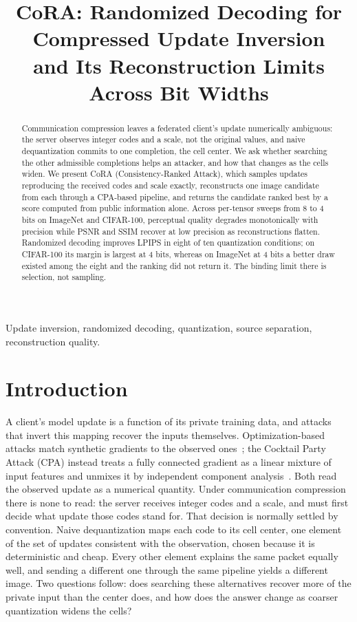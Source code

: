 \documentclass{article}
\title{CoRA: Randomized Decoding for Compressed Update Inversion\\
and Its Reconstruction Limits Across Bit Widths}
\newcommand{\cora}{CoRA}
\begin{document}
\maketitle

\begin{abstract}
Communication compression leaves a federated client's update numerically
ambiguous: the server observes integer codes and a scale, not the original
values, and naive dequantization commits to one completion, the cell center.
We ask whether searching the other admissible completions helps an attacker,
and how that changes as the cells widen. We present \cora{}
(Consistency-Ranked Attack), which samples updates reproducing the received
codes and scale exactly, reconstructs one image candidate from each through a
CPA-based pipeline, and returns the candidate ranked best by a score computed
from public information alone. Across per-tensor sweeps from 8 to 4 bits on
ImageNet and CIFAR-100, perceptual quality degrades monotonically with
precision while PSNR and SSIM recover at low precision as reconstructions
flatten. Randomized decoding improves LPIPS in eight of ten quantization
conditions; on CIFAR-100 its margin is largest at 4 bits, whereas on ImageNet
at 4 bits a better draw existed among the eight and the ranking did not return
it. The binding limit there is selection, not sampling.
\end{abstract}

\begin{keywords}
Update inversion, randomized decoding,
quantization, source separation, reconstruction quality.
\end{keywords}

\section{Introduction}
\label{sec:intro}
A client's model update is a function of its private training data, and
attacks that invert this mapping recover the inputs themselves.
Optimization-based attacks match synthetic gradients to the observed
ones~\cite{zhu2019deep,geiping2020inverting}; the Cocktail Party Attack (CPA)
instead treats a fully connected gradient as a linear mixture of input
features and unmixes it by independent component
analysis~\cite{kariyappa2023cocktail}. Both read the observed update as a
numerical quantity. Under communication compression there is none to read: the
server receives integer codes and a scale, and must first decide what update
those codes stand for. That decision is normally settled by convention. Naive
dequantization maps each code to its cell center, one element of the set of
updates consistent with the observation, chosen because it is deterministic
and cheap. Every other element explains the same packet equally well, and
sending a different one through the same pipeline yields a different image.
Two questions follow: does searching these alternatives recover more of the
private input than the center does, and how does the answer change as coarser
quantization widens the cells?
\end{document}
